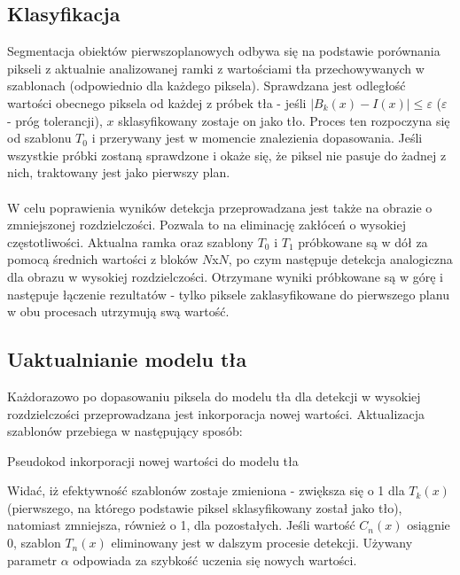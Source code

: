 \subsection{Klasyfikacja}
Segmentacja obiektów pierwszoplanowych odbywa się na podstawie porównania pikseli z aktualnie analizowanej ramki z wartościami tła przechowywanych w szablonach (odpowiednio dla każdego piksela).  Sprawdzana jest odległość wartości obecnego piksela od każdej z próbek tła - jeśli $|B_{k}(x)-I(x)|\leq \varepsilon$ ($\varepsilon$ - próg tolerancji), $x$ sklasyfikowany zostaje on jako tło. Proces ten rozpoczyna się od szablonu $T_{0}$ i przerywany jest w momencie znalezienia dopasowania. Jeśli wszystkie próbki zostaną sprawdzone i okaże się, że piksel nie pasuje do żadnej z nich, traktowany jest jako pierwszy plan.
\paragraph{}
W celu poprawienia wyników detekcja przeprowadzana jest także na obrazie o zmniejszonej rozdzielczości. Pozwala to na eliminację zakłóceń o wysokiej częstotliwości. Aktualna ramka oraz szablony $T_{0}$ i $T_{1}$ próbkowane są w dół za pomocą średnich wartości z bloków $N$x$N$, po czym następuje detekcja analogiczna dla obrazu w wysokiej rozdzielczości. Otrzymane wyniki próbkowane są w górę i następuje łączenie rezultatów - tylko piksele zaklasyfikowane do pierwszego planu w obu procesach utrzymują swą wartość.
\subsection{Uaktualnianie modelu tła}
Każdorazowo po dopasowaniu piksela do modelu tła dla detekcji w wysokiej rozdzielczości przeprowadzana jest inkorporacja nowej wartości. Aktualizacja szablonów przebiega w następujący sposób:
\begin{algorithm}[H]
  
 \caption{Pseudokod inkorporacji nowej wartości do modelu tła}
\end{algorithm}
 Widać, iż efektywność szablonów zostaje zmieniona - zwiększa się o 1 dla $T_{k}(x)$ (pierwszego, na którego podstawie piksel sklasyfikowany został jako tło), natomiast zmniejsza, również o 1, dla pozostałych. Jeśli wartość $C_{n}(x)$ osiągnie 0, szablon $T_{n}(x)$ eliminowany jest w dalszym procesie detekcji. Używany parametr $\alpha$ odpowiada za szybkość uczenia się nowych wartości. 
